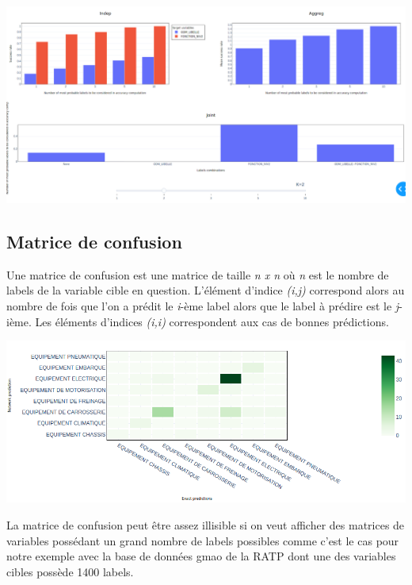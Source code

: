 \begin{center}
\includegraphics[scale=0.25]{figures/visu_success.png}
\label{fig11}
\end{center}

\subsection{Matrice de confusion}

Une matrice de confusion est une matrice de taille \textit{n x n} où \textit{n} est le nombre de
labels de la variable cible en question. L'élément d’indice \textit{(i,j)} correspond alors au
nombre de fois que l’on a prédit le \textit{i}-ème label alors que le label à prédire est le
\textit{j}-ième. Les éléments d’indices \textit{(i,i)} correspondent aux cas de bonnes prédictions.

\begin{center}
\includegraphics[scale=0.45]{figures/confusion_matrix.png}
\label{fig12}
\end{center}

La matrice de confusion peut être assez illisible si on veut afficher des matrices de variables possédant un grand nombre de labels possibles comme c’est le cas pour notre exemple avec la base de données gmao de la RATP dont une des variables cibles possède 1400 labels.

